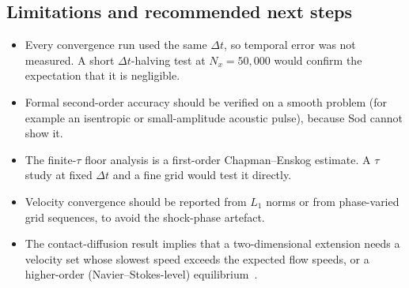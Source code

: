 \subsection{Limitations and recommended next steps}
\begin{itemize}
  \item Every convergence run used the same $\Delta t$, so temporal error was not
        measured.  A short $\Delta t$-halving test at $N_x=50{,}000$ would confirm the
        expectation that it is negligible.
  \item Formal second-order accuracy should be verified on a smooth problem (for
        example an isentropic or small-amplitude acoustic pulse), because Sod
        cannot show it.
  \item The finite-$\tau$ floor analysis is a first-order Chapman--Enskog estimate.
        A $\tau$ study at fixed $\Delta t$ and a fine grid would test it directly.
  \item Velocity convergence should be reported from $L_1$ norms or from phase-varied
        grid sequences, to avoid the shock-phase artefact.
  \item The contact-diffusion result implies that a two-dimensional extension needs
        a velocity set whose slowest speed exceeds the expected flow speeds, or a
        higher-order (Navier--Stokes-level) equilibrium~\citep{KataokaTsutahara2004NS,Gan2018}.
\end{itemize}
